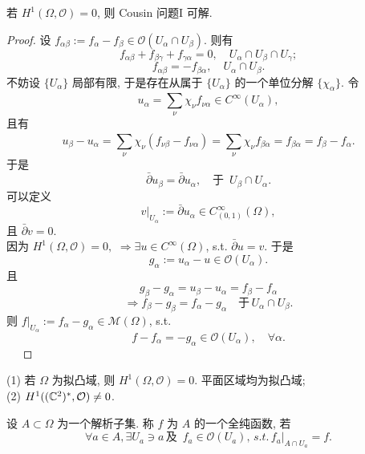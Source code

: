 \begin{theorem}
    若 $H^1(\Omega ,\mathcal{O})=0$, 则 Cousin 问题I 可解. 
  \end{theorem}
\begin{proof}
  设 $f_{\alpha \beta }:= f_{\alpha }-f_{\beta } \in \mathcal{O}(U_{\alpha }\cap U_{\beta })$. 
  则有 
  $$ f_{\alpha \beta } +f_{\beta \gamma } +f_{\gamma \alpha }=0, \quad U_{\alpha }\cap U_{\beta   } \cap U_{\gamma };$$
  $$ f_{\alpha \beta }=-f_{\beta \alpha }, \quad   U_{\alpha }\cap U_{\beta   }.$$ 
  不妨设 $\{U_{\alpha }\}$ 局部有限, 于是存在从属于 $\{U_{\alpha }\}$ 的一个单位分解 $\{\chi _{\alpha }\}$.   
  令 
  $$ u_{\alpha }=\sum_{\nu }^{} \chi _{\nu }f_{\nu \alpha } \in C^{\infty }(U_{\alpha }), $$
  且有 
  $$u_{\beta }-u_{\alpha }= \sum_{\nu }^{} \chi _{\nu }(f_{\nu \beta  }-f_{\nu \alpha })=\sum_{\nu }^{} \chi _{\nu }f_{\beta \alpha }=f_{\beta \alpha }=f_{\beta }-f_{\alpha }. $$ 
  于是
  $$  \bar{\partial }u_{\beta }= \bar{\partial }u_{\alpha  }, \quad \text{于 } \, U_{\beta } \cap U_{\alpha }.$$
  可以定义 
  $$ v|_{U_{\alpha }}:= \bar{\partial }u_{\alpha  } \in C_{(0,1)}^{\infty }(\Omega ),$$
  且 $\bar{\partial }v=0.$ \\
  因为 $H^1(\Omega ,\mathcal{O})=0,$ $\Rightarrow \exists u \in C^{\infty }(\Omega )$, s.t. $\bar{\partial }u=v$.
  于是
  $$ g_{\alpha }:= u_{\alpha }-u \in \mathcal{O}(U_{\alpha }) .$$
   且 
   $$ g_{\beta }-g_{\alpha } = u_{\beta }-u_{\alpha }=f_{\beta }-f_{\alpha } $$
   $$ \Rightarrow f_{\beta }-g_{\beta }=f_{\alpha }-g_{\alpha } \quad \text{于} \, U_{\alpha } \cap U_{\beta }. $$
  则 $f|_{U_\alpha }:=f_{\alpha }-g_{\alpha } \in \mathcal{M}(\Omega )$, s.t. 
  $$ f-f_{\alpha }=-g_{\alpha } \in \mathcal{O}(U_{\alpha }), \quad \forall \alpha . $$
  ~~ 
\end{proof}

\begin{remark}
  (1) 若 $\Omega $ 为拟凸域, 则 $H^1(\Omega ,\mathcal{O})=0$. 平面区域均为拟凸域;\\
  (2)  $H^{1}(({\mathbb C}^2)^{*},\mathcal{O}) \neq 0$. 
\end{remark}

\begin{definition}
  设 $A \subset \Omega $ 为一个解析子集. 称 $f$ 为 $A$ 的一个全纯函数, 若 
  $$ \forall a \in A, \exists U_{a } \ni a \,\text{及 }\, f_{a} \in \mathcal{O}(U_{a}), \,s.t.\, f_{a}|_{A \cap U_{a }}=f. $$   
\end{definition}

